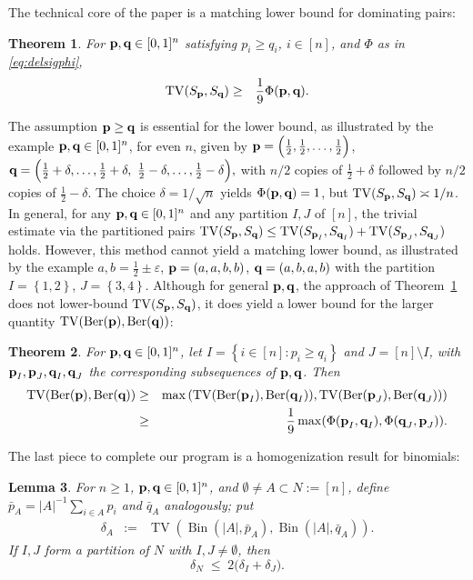 \documentclass[11pt]{amsart}
\theoremstyle{plain}
\newtheorem{theorem}{Theorem}[section]
\newtheorem{lemma}[theorem]{Lemma}
\theoremstyle{definition}
\DeclareMathOperator{\TV}{TV}
\DeclareMathOperator{\Bin}{Bin}
\DeclareMathOperator{\Ber}{Ber}
\newcommand{\beq}{\begin{eqnarray*}}
\newcommand{\eeq}{\end{eqnarray*}}
\newcommand{\paren}[1]{\left( #1 \right)}
\newcommand{\set}[1]{\left\{ #1 \right\}}
\newcommand{\eps}{\varepsilon}
\newcommand{\mybin}[2]{\Bin(#1,#2)}
\renewcommand{\vec}[1]{\textup{{\bf #1}}}
\begin{document}
The technical core of the paper is a matching lower bound
for dominating pairs:
\begin{theorem}
\label{thm:PB-lower-Phi}
For $\vec{p},\vec{q}\in[0,1]^n$
satisfying $p_i\ge q_i$, $i\in[n]$,
and $\Phi$ as in \eqref{eq:delsigphi},
\beq
\TV(S_{\vec{p}},S_{\vec{q}})
&\ge&
\frac{1}{9}
\Phi(\vec{p},\vec{q})
.
\eeq
\end{theorem}
\noindent The assumption $\vec{p}\ge \vec{q}$ is essential for the lower bound,
as illustrated by the example $\vec p,\vec q\in[0,1]^n$, for even
$n$, given by
$
\vec p
=
\Bigl(\tfrac12,\tfrac12,\dots,\tfrac12\Bigr)
$,
$
\vec q
=
\Bigl(\tfrac12+\delta,\dots,\tfrac12+\delta,\ \tfrac12-\delta,\dots,\tfrac12-\delta\Bigr),
$
with $n/2$ copies of $\tfrac12+\delta$ followed by $n/2$ copies of $\tfrac12-\delta$.
The choice
$\delta=1/\sqrt n$
yields
$\Phi(\vec p,\vec q)=1$,
but $\TV(S_{\vec p},S_{\vec q})\asymp1/n$.
In general, for any $\vec{p},\vec{q}\in[0,1]^n$
and any partition $I,J$ of $[n]$,
the
trivial estimate via the partitioned pairs
$
\TV(S_{\vec{p}},S_{\vec{q}})
\le
\TV(S_{\vec{p}_I},S_{\vec{q}_I})
+
\TV(S_{\vec{p}_J},S_{\vec{q}_J})
$
holds.
However, this method cannot yield a matching lower bound,
as illustrated by the example
$a,b=\tfrac12\pm\eps$,
$
\vec{p}=(a,a,b,b)
$,
$
\vec{q}=(a,b,a,b)
$
with the partition
$I=\set{1,2}$, $J=\set{3,4}$.
Although
for general $\vec{p},\vec{q}$,
the approach of Theorem~\ref{thm:PB-lower-Phi}
does not lower-bound $\TV(S_{\vec{p}},S_{\vec{q}})$, it does
yield a lower bound
for
the larger quantity
$
\TV(\Ber(\vec{p}),\Ber(\vec{q}))
$:
\begin{theorem}
\label{thm:tv-ber-lb}
For $\vec{p},\vec{q}\in[0,1]^n$,
let $I=\set{i\in[n]:p_i\ge q_i}$ and $J=[n]\setminus I$,
with
$\vec{p}_I,\vec{p}_J,\vec{q}_I,\vec{q}_J$ the corresponding subsequences of $\vec{p},\vec{q}$.
Then
\beq
\TV(\Ber(\vec{p}),\Ber(\vec{q}))
&\ge&
\max\paren{
\TV(\Ber(\vec{p}_I),\Ber(\vec{q}_I))
,
\TV(\Ber(\vec{p}_J),\Ber(\vec{q}_J))
}\\
&\ge&
\frac{1}{9}
\max(
\Phi(\vec{p}_I,\vec{q}_I)
,
\Phi(\vec{q}_J,\vec{p}_J)
).
\eeq
\end{theorem}

The last piece to complete our
program is a
homogenization result for binomials:
\begin{lemma}
\label{lem:bin-homog}
For $n\ge1$, $\vec{p},\vec{q}\in[0,1]^n$, and $\emptyset\neq A\subset N:=
[n]
$, define
$\bar p_A=|A|^{-1}\sum_{i\in A} p_i$ and $\bar q_A$
analogously;
put
\beq
\delta_A &:=& \TV(\mybin{|A|}{\bar p_A},\mybin{|A|}{\bar q_A}).
\eeq
If $I,J$ form a partition of $N$ with $I,J\neq\emptyset$, then
\[
\delta_{N} \;\le\; 2\bigl(\delta_I+\delta_J\bigr).
\]
\end{lemma}
\end{document}
